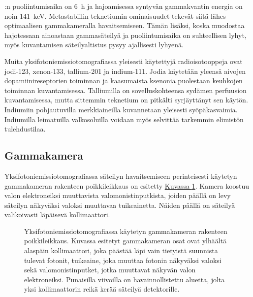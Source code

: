 :n puoliintumisaika on \qty{6}{\hour} ja hajoamisessa syntyvän gammakvantin energia on noin \qty{141}{\kilo\electronvolt}.\cite{cherry_interaction_2012, cherry_single_2012, crisan_radiopharmaceuticals_2022, van_audenhaege_review_2015} Metastabiilin teknetiumin ominaisuudet tekevät siitä lähes optimaalisen gammakameralla havaitsemiseen. Tämän lisäksi, koska  muodostaa hajotessaan ainoastaan gammasäteilyä ja puoliintumisaika on suhteellisen lyhyt, myös kuvantamisen säteilyaltistus pysyy ajallisesti lyhyenä.\cite{cherry_modes_2012, crisan_radiopharmaceuticals_2022}

Muita yksifotoniemissiotomografiassa yleisesti käytettyjä radioisotooppeja ovat jodi-123, xenon-133, tallium-201 ja indium-111. Jodia käytetään yleensä aivojen dopamiinireseptorien toiminnan ja kaasumaista ksenonia puolestaan keuhkojen toiminnan kuvantamisessa. Talliumilla on sovelluskohteensa sydämen perfuusion kuvantamisessa, mutta sittemmin teknetium on pitkälti syrjäyttänyt sen käytön. Indiumiin pohjautuvilla merkkiaineilla kuvannetaan yleisesti syöpäkasvaimia. Indiumilla leimatuilla valkosoluilla voidaan myös selvittää tarkemmin elimistön tulehdustilaa.\cite{crisan_radiopharmaceuticals_2022}

\subsection{Gammakamera}
Yksifotoniemissiotomografiassa säteilyn havaitsemiseen perinteisesti käytetyn gammakameran rakenteen poikkileikkaus on esitetty \hyperref[fig:spect-detektori]{Kuvassa \ref*{fig:spect-detektori}}. Kamera koostuu valon elektroneiksi muuttavista valomonistinputkista, joiden päällä on levy säteilyn näkyväksi valoksi muuttavaa tuikeainetta. Näiden päällä on säteilyä valikoivasti läpäisevä kollimaattori.\cite{van_audenhaege_review_2015, cherry_gamma_2012}

\begin{figure}[H]
    \centering
    \captionsetup{width=.9\textwidth}
    
    \caption{Yksifotoniemissiotomografiassa käytetyn gammakameran rakenteen poikkileikkaus. Kuvassa esitetyt gammakameran osat ovat ylhäältä alaspäin kollimaattori, joka päästää läpi vain tietyistä suunnista tulevat fotonit, tuikeaine, joka muuttaa fotonin näkyväksi valoksi sekä valomonistinputket, jotka muuttavat näkyvän valon elektroneiksi. Punaisilla viivoilla on havainnollistettu aluetta, jolta yksi kollimaattorin reikä kerää säteilyä detektorille.}
    \label{fig:spect-detektori}
\end{figure}


